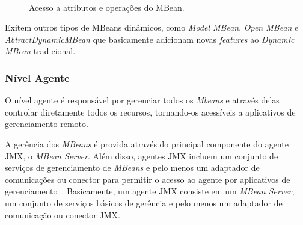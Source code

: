 \begin{figure}[htp]
\centering
{}
\\
\caption{Acesso a atributos e operações do MBean.}
\label{fig:requestjmx}
\end{figure}

Exitem outros tipos de MBeans dinâmicos, como \textit{Model MBean}, \textit{Open MBean} e \textit{AbtractDynamicMBean} que basicamente adicionam novas \textit{features} ao \textit{Dynamic MBean} tradicional. 

\subsubsection{Nível Agente}
O nível agente é responsável por gerenciar todos os \textit{Mbeans} e através delas controlar diretamente todos os recursos, tornando-os acessíveis a aplicativos de gerenciamento remoto.

A gerência dos \textit{MBeans} é provida através do principal componente do agente JMX, o \textit{MBean Server}. Além disso, agentes JMX incluem um conjunto de serviços de gerenciamento de \textit{MBeans} e pelo menos um adaptador de comunicações ou conector para permitir o acesso ao agente por aplicativos de gerenciamento~\cite{jmx}. Basicamente, um agente JMX consiste em um \textit{MBean Server}, um conjunto de serviços básicos de gerência e pelo menos um adaptador de comunicação ou conector JMX.

